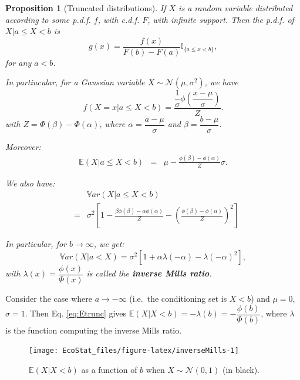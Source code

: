\documentclass[
  12pt,
]{book}
\newtheorem{proposition}{Proposition}[chapter]
\theoremstyle{definition}
\theoremstyle{definition}
\theoremstyle{definition}
\theoremstyle{definition}
\theoremstyle{remark}
\begin{document}
\begin{proposition}[Truncated distributions]
\protect\hypertarget{prp:truncated}{}\label{prp:truncated}If \(X\) is a random variable distributed according to some p.d.f. \(f\), with c.d.f. \(F\), with infinite support. Then the p.d.f. of \(X|a \le X < b\) is
\[
g(x) = \frac{f(x)}{F(b)-F(a)}\mathbb{I}_{\{a \le x < b\}},
\]
for any \(a<b\).

In partiucular, for a Gaussian variable \(X \sim \mathcal{N}(\mu,\sigma^2)\), we have
\[
f(X=x|a\le X<b) = \dfrac{\dfrac{1}{\sigma}\phi\left(\dfrac{x - \mu}{\sigma}\right)}{Z}.
\]
with \(Z = \Phi(\beta)-\Phi(\alpha)\), where \(\alpha = \dfrac{a - \mu}{\sigma}\) and \(\beta = \dfrac{b - \mu}{\sigma}\).

Moreover:
\begin{eqnarray}
\mathbb{E}(X|a\le X<b) &=& \mu - \frac{\phi\left(\beta\right)-\phi\left(\alpha\right)}{Z}\sigma. \label{eq:Etrunc}
\end{eqnarray}

We also have:
\begin{eqnarray}
&& \mathbb{V}ar(X|a\le X<b) \nonumber\\
&=& \sigma^2\left[
1 -  \frac{\beta\phi\left(\beta\right)-\alpha\phi\left(\alpha\right)}{Z} -  \left(\frac{\phi\left(\beta\right)-\phi\left(\alpha\right)}{Z}\right)^2 \right] \label{eq:Vtrunc}
\end{eqnarray}

In particular, for \(b \rightarrow \infty\), we get:
\begin{equation}
\mathbb{V}ar(X|a < X) = \sigma^2\left[1 + \alpha\lambda(-\alpha) - \lambda(-\alpha)^2 \right], \label{eq:Vtrunc2}
\end{equation}
with \(\lambda(x)=\dfrac{\phi(x)}{\Phi(x)}\) is called the \textbf{inverse Mills ratio}.
\end{proposition}

Consider the case where \(a \rightarrow - \infty\) (i.e.~the conditioning set is \(X<b\)) and \(\mu=0\), \(\sigma=1\). Then Eq. \eqref{eq:Etrunc} gives \(\mathbb{E}(X|X<b) = - \lambda(b) = - \dfrac{\phi(b)}{\Phi(b)}\), where \(\lambda\) is the function computing the inverse Mills ratio.

\begin{figure}
\texttt{[image: EcoStat\_files/figure-latex/inverseMills-1]} \caption{$\mathbb{E}(X|X<b)$ as a function of $b$ when $X\sim \mathcal{N}(0,1)$ (in black).}\label{fig:inverseMills}
\end{figure}
\end{document}
